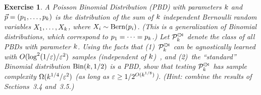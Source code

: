 \documentclass[biber]{nowfnt} %
\newtheorem{question}{Exercise}[chapter]
\begin{document}
\newcommand{\pbd}{\hspace{1pt}{\cdot}\kern -4pt {\subset}\kern -3pt {\rtimes}}
\begin{question}\label{ex:testing:pbd}
  A \emph{Poisson Binomial Distribution} (PBD) with parameters $k$ and $\vec{p}=(p_1,\dots,p_k)$ is the distribution of the sum of $k$ independent Bernoulli random variables $X_1,\dots,X_k$, where $X_i \sim \operatorname{Bern}( p_i ) $. (This is a generalization of Binomial distributions, which correspond to $p_1=\dots=p_k$.) Let $\property^{\pbd}_{\ab}$ denote the class of all PBDs with parameter $k$. Using the facts that (1)~$\property^{\pbd}_{\ab}$ can be agnostically learned with $O(\log^2(1/\varepsilon)/\varepsilon^2)$ samples (independent of $k$)~\citep{DDS:PBD:15}, and (2)~the ``standard'' Binomial distribution $\binomial{\ab}{1/2}$ is a PBD, show that testing $\property^{\pbd}_{\ab}$ has sample complexity $\Omega(k^{1/4}/\varepsilon^2)$ (as long as $\varepsilon \geq 1/2^{O(k^{1/8})}$). \textit{(Hint: combine the results of Sections~3.4 and~3.5.)}
\end{question}
\end{document}
